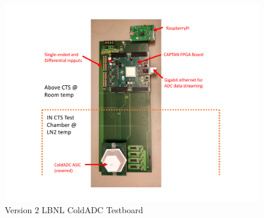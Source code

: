 \begin{figure}[!ht]
\centering
  \includegraphics[width=0.85\linewidth]{figures/prakash_fig/TestBoard2_CTS.pdf}
  \caption[LBNL ColdADC Testboard]{Version 2 LBNL ColdADC Testboard}
  \label{fig:v2_board}
\end{figure}


